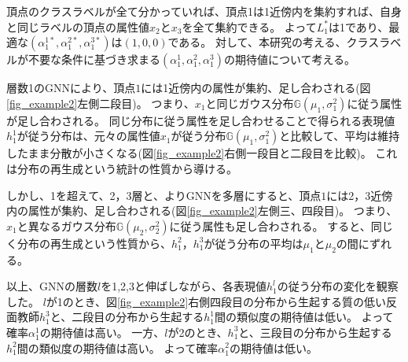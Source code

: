 \documentclass[a4j,twocolumn]{jsarticle}
\begin{document}

\vspace{-3mm}
頂点のクラスラベルが全て分かっていれば、頂点1は1近傍内を集約すれば、自身と同じラベルの頂点の属性値$x_2$と$x_3$を全て集約できる。
よって$L_1^*$は1であり、最適な$(\alpha_1^{1*},\alpha_1^{2*},\alpha_1^{3*})$は$(1,0,0)$である。
対して、本研究の考える、クラスラベルが不要な条件に基づき求まる$(\alpha_1^1,\alpha_1^2,\alpha_1^3)$の期待値について考える。

層数1のGNNにより、頂点$1$には1近傍内の属性が集約、足し合わされる(図\ref{fig_example2}左側二段目)。
つまり、$x_1$と同じガウス分布$\mathbb{G}(\mu_1, \sigma_1^2)$に従う属性が足し合わされる。
同じ分布に従う属性を足し合わせることで得られる表現値$h_1^1$が従う分布は、元々の属性値$x_1$が従う分布$\mathbb{G}(\mu_1, \sigma_1^2)$と比較して、平均は維持したまま分散が小さくなる(図\ref{fig_example2}右側一段目と二段目を比較)。
これは分布の再生成という統計の性質から導ける。

しかし、1を超えて、2，3層と、よりGNNを多層にすると、頂点$1$には2，3近傍内の属性が集約、足し合わされる(図\ref{fig_example2}左側三、四段目)。
つまり、$x_1$と異なるガウス分布$\mathbb{G}(\mu_2, \sigma_2^2)$に従う属性も足し合わされる。
すると、同じく分布の再生成という性質から、$h_1^2$，$h_1^3$が従う分布の平均は$\mu_1$と$\mu_2$の間にずれる。

以上、GNNの層数$l$を1,2,3と伸ばしながら、各表現値$h_1^l$の従う分布の変化を観察した。
$l$が1のとき、図\ref{fig_example2}右側四段目の分布から生起する質の低い反面教師$h_1^3$と、二段目の分布から生起する$h_1^1$間の類似度の期待値は低い。
よって確率$\alpha_1^1$の期待値は高い。
一方、$l$が2のとき、$h_1^3$と、三段目の分布から生起する$h_1^2$間の類似度の期待値は高い。
よって確率$\alpha_1^2$の期待値は低い。
\end{document}
